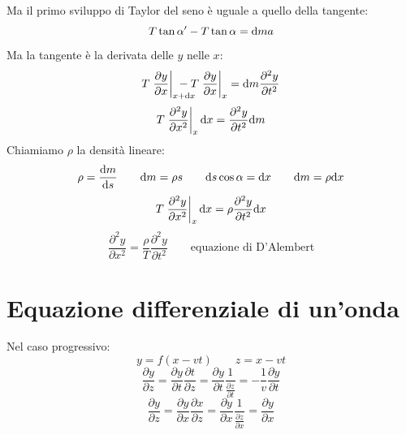 Ma il primo sviluppo di Taylor del seno è uguale a quello della tangente:
\begin{equation*}T\tan\alpha'-T\tan\alpha=\mathrm{d} m a\end{equation*}
Ma la tangente è la derivata delle $y$ nelle $x$:
\begin{equation*}T\left.\frac{\partial y}{\partial x}\right |_{x+\ud x}\!\!\!\!\!\!\!\!\!\!-T\left.\frac{\partial y}{\partial x}\right|_{x}=\ud m\frac{\partial^2 y}{\partial t^2}\end{equation*}
\begin{equation*}T\left.\frac{\partial^2 y}{\partial x^2}\right|_x\mathrm{d} x=\frac{\partial^2 y}{\partial t^2}\mathrm{d} m\end{equation*}
Chiamiamo $\rho$ la densità lineare:
\begin{equation*}\rho=\frac{\mathrm{d} m}{\mathrm{d} s}\qquad \mathrm{d} m=\rho s\qquad \mathrm{d} s\cos\alpha=\mathrm{d} x\qquad\mathrm{d} m=\rho\mathrm{d} x\end{equation*}
\begin{equation*}T\left.\frac{\partial^2 y}{\partial x^2}\right|_x\mathrm{d} x=\rho\frac{\partial^2 y}{\partial t^2}\mathrm{d} x\end{equation*}
\begin{equation*}\frac{\partial^2 y}{\partial x^2}=\frac{\rho}{T}\frac{\partial^2 y}{\partial t^2}\qquad\text{equazione di D'Alembert}\end{equation*}

\parbox[]{\textwidth}{
\section{Equazione differenziale di un'onda}
Nel caso progressivo:
\begin{equation*}y=f(x-vt)\qquad z=x-vt\end{equation*}
\begin{equation*}\frac{\partial y}{\partial z}=\frac{\partial y}{\partial t}\frac{\partial t}{\partial z}=\frac{\partial y}{\partial t}\frac{1}{\frac{\partial z}{\partial t}}=-\frac{1}{v}\frac{\partial y}{\partial t}\end{equation*}
\begin{equation*}\frac{\partial y}{\partial z}=\frac{\partial y}{\partial x}\frac{\partial x}{\partial z}=\frac{\partial y}{\partial x}\frac{1}{\frac{\partial z}{\partial x}}=\frac{\partial y}{\partial x}\end{equation*}
}

